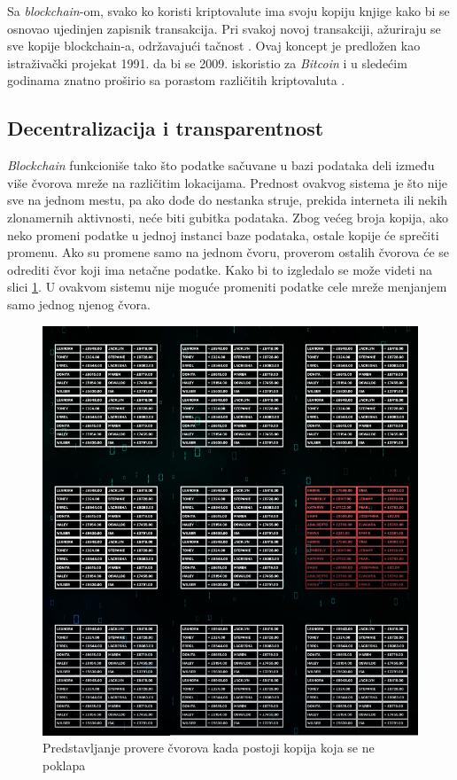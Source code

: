 \documentclass[a4paper]{article}
\begin{document}
{Sa \emph{blockchain}-om, svako ko koristi kriptovalute ima svoju kopiju knjige kako bi se osnovao ujedinjen zapisnik transakcija. Pri svakoj novoj transakciji, ažuriraju se sve kopije blockchain-a, održavajući tačnost \cite{kriptovalute2}. Ovaj koncept je predložen kao istraživački projekat 1991. da bi se 2009. iskoristio za \emph{Bitcoin} i u sledećim godinama znatno proširio sa porastom različitih kriptovaluta \cite{blockchain}.


\subsection{Decentralizacija i transparentnost}
\label{subsec:decentralizacija}
\emph{Blockchain} funkcioniše tako što podatke sačuvane u bazi podataka deli između više čvorova mreže na različitim lokacijama. Prednost ovakvog sistema je što nije sve na jednom mestu, pa ako dođe do nestanka struje, prekida interneta ili nekih zlonamernih aktivnosti, neće biti gubitka podataka. Zbog većeg broja kopija, ako neko promeni podatke u jednoj instanci baze podataka, ostale kopije će sprečiti promenu. Ako su promene samo na jednom čvoru, proverom ostalih čvorova će se odrediti čvor koji ima netačne podatke. Kako bi to izgledalo se može videti na slici \ref{fig:proverakopija}. U ovakvom sistemu nije moguće promeniti podatke cele mreže menjanjem samo jednog njenog čvora.

\begin{figure}[h!]
\begin{center}
\includegraphics[scale=0.4]{slike/slika1.png}
\end{center}
\caption{Predstavljanje provere čvorova kada postoji kopija koja se ne poklapa}
\label{fig:proverakopija}
\end{figure}


}
\end{document}
